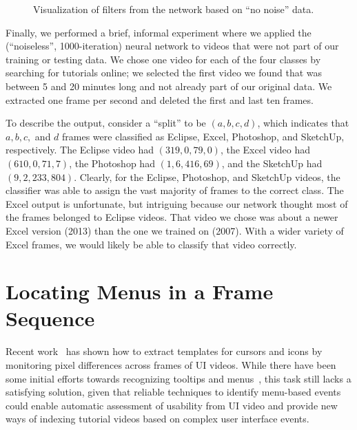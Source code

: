 \documentclass[10pt]{article}
\begin{document}
\begin{figure}[t]
\begin{minipage}{.35\textwidth}
  \caption{Visualization of filters from the network based on ``no noise'' data.}
  \label{fig:filters_nonoise}
  \end{minipage}
\end{figure}

Finally, we performed a brief, informal experiment where we applied the (``noiseless'',
1000-iteration) neural network to videos that were not part of our training or testing data. We
chose one video for each of the four classes by searching for tutorials online; we selected the
first video we found that was between 5 and 20 minutes long and not already part of our original
data. We extracted one frame per second and deleted the first and last ten frames.

To describe the output, consider a ``split'' to be $(a,b,c,d)$, which indicates that $a, b, c,$ and
$d$ frames were classified as Eclipse, Excel, Photoshop, and SketchUp, respectively.  The Eclipse
video had $(319,0,79,0)$, the Excel video had $(610,0,71,7)$, the Photoshop had $(1,6,416,69)$, and
the SketchUp had $(9,2,233,804)$. Clearly, for the Eclipse, Photoshop, and SketchUp videos, the
classifier was able to assign the vast majority of frames to the correct class. The Excel output is
unfortunate, but intriguing because our network thought most of the frames belonged to Eclipse
videos. That video we chose was about a newer Excel version (2013) than the one we trained on
(2007).  With a wider variety of Excel frames, we would likely be able to classify that video
correctly.

\section{Locating Menus in a Frame Sequence}\label{andrew}

Recent work~\cite{banovic_waken_2012} has shown how to extract templates for cursors and icons by
monitoring pixel differences across frames of UI videos.  While there have been some initial efforts
towards recognizing tooltips and menus~\cite{banovic_waken_2012}, this task still lacks a
satisfying solution, given that reliable techniques to identify menu-based events could enable
automatic assessment of usability from UI video and provide new ways of indexing tutorial videos
based on complex user interface events.
\end{document}
